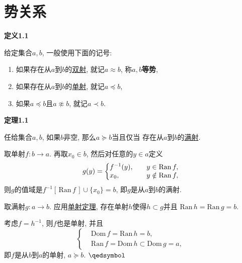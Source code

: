 \documentclass[UTF8]{ctexart}
\begin{document}
\setlength{\abovedisplayskip}{1pt}
\setlength{\belowdisplayskip}{1pt}

\section{势关系}

\hypertarget{sec:定义1.1}{}
\noindent\textbf{定义1.1}

给定集合$a,b$, 一般使用下面的记号:
\begin{enumerate}
    \item 如果存在从$a$到$b$的\href{03 映射#nameddest=sec:定义2.2}{双射},
    就记$a\approx b$, 称$a,b$\textbf{等势},
    \item 如果存在从$a$到$b$的\href{03 映射#nameddest=sec:定义2.1}{单射},
    就记$a\preccurlyeq b$,
    \item 如果$a\preccurlyeq b$且$a\not\approx b$,
    就记$a\prec b$.
\end{enumerate}

\vspace{15pt}

\hypertarget{sec:定理1.1}{}
\noindent\textbf{定理1.1}

任给集合$a,b$, 如果$b$非空, 那么$a\succcurlyeq b$当且仅当
存在从$a$到$b$的\href{03 映射#nameddest=sec:定义2.2}{满射}.



取单射$f:b\to a$. 再取$x_0\in b$, 然后对任意的$y\in a$定义
\vspace{3pt}
\[g(y)=\left\{\begin{aligned}
    &f^{-1}(y),\quad&&y\in\mathrm{Ran}\,f,\\[-3pt]
    &x_0,\quad&&y\notin\mathrm{Ran}\,f,
\end{aligned}\right.\\[3pt]\]
则$g$的值域是$f^{-1}[\,\mathrm{Ran}\,f\,]\cup\{x_0\}=b$,
即$g$是从$a$到$b$的满射.


取满射$g:a\to b$. 应用\href{03 映射#nameddest=sec:定理3.2}{单射定理},
存在单射$h$使得$h\subset g$并且
$\mathrm{Ran}\,h=\mathrm{Ran}\,g=b$.

考虑$f=h^{-1}$, 则$f$也是单射, 并且
\[\left\{\begin{aligned}
    &\mathrm{Dom}\,f=\mathrm{Ran}\,h=b,\\[-3pt]
    &\mathrm{Ran}\,f=\mathrm{Dom}\,h\subset\mathrm{Dom}\,g=a,
\end{aligned}\right.\]
即$f$是从$b$到$a$的单射, $a\succcurlyeq b$. \hfill $\qedsymbol$
\end{document}
